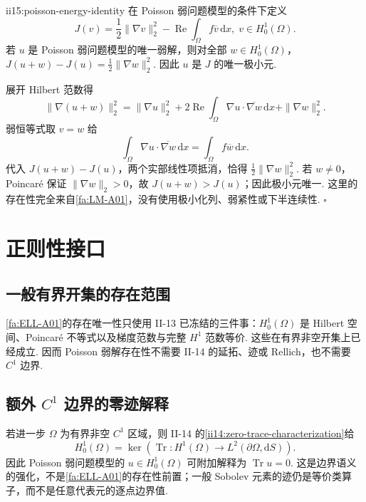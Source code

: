 \begin{FAProposition}{ii15:poisson-energy-identity}
在 Poisson 弱问题模型的条件下定义
\[
J(v)
=
\frac12\|\nabla v\|_2^2
-
\operatorname{Re}
\int_\Omega
f\overline v
\,\mathrm{d}x,
\;
v\in H_0^1(\Omega).
\]
若 \(\displaystyle u\) 是 Poisson 弱问题模型的唯一弱解，则对全部 \(\displaystyle w\in H_0^1(\Omega)\)， \(\displaystyle J(u+w)-J(u) = \frac12\|\nabla w\|_2^2.\)
因此 \(\displaystyle u\) 是 \(\displaystyle J\) 的唯一极小元.
\end{FAProposition}

\begin{FAProof}
展开 Hilbert 范数得
\[
\|\nabla(u+w)\|_2^2
=
\|\nabla u\|_2^2
+2\operatorname{Re}\int_\Omega\nabla u\mathbin{\cdot}\overline{\nabla w}\,\mathrm{d}x
+\|\nabla w\|_2^2.
\]
弱恒等式取 \(\displaystyle v=w\) 给
\[
\int_\Omega
\nabla u\mathbin{\cdot}\overline{\nabla w}
\,\mathrm{d}x
=
\int_\Omega
f\overline w
\,\mathrm{d}x.
\]
代入 \(\displaystyle J(u+w)-J(u)\)，两个实部线性项抵消，恰得 \(\displaystyle\frac12\|\nabla w\|_2^2\). 若 \(\displaystyle w\neq0\)，Poincaré 保证 \(\displaystyle\|\nabla w\|_2>0\)，故 \(\displaystyle J(u+w)>J(u)\)；因此极小元唯一. 这里的存在性完全来自\autoref{fa:LM-A01}，没有使用极小化列、弱紧性或下半连续性.
\hfill\(\square\)
\end{FAProof}

\section{正则性接口}\label{sec:ii15-regularity-interface}

\subsection{一般有界开集的存在范围}
\autoref{fa:ELL-A01}的存在唯一性只使用 II-13 已冻结的三件事：\(\displaystyle H_0^1(\Omega)\) 是 Hilbert 空间、Poincaré 不等式以及梯度范数与完整 \(\displaystyle H^1\) 范数等价. 这些在有界非空开集上已经成立. 因而 Poisson 弱解存在性不需要 II-14 的延拓、迹或 Rellich，也不需要 \(\displaystyle C^1\) 边界.

\subsection{额外 \(\displaystyle C^1\) 边界的零迹解释}
若进一步 \(\displaystyle\Omega\) 为有界非空 \(\displaystyle C^1\) 区域，则 II-14 的\autoref{ii14:zero-trace-characterization}给
\[
H_0^1(\Omega)
=
\ker\left(\operatorname{Tr}:H^1(\Omega)\to L^2(\partial\Omega,\mathrm{d}S)\right).
\]
因此 Poisson 弱问题模型的 \(\displaystyle u\in H_0^1(\Omega)\) 可附加解释为 \(\displaystyle\operatorname{Tr}u=0\). 这是边界语义的强化，不是\autoref{fa:ELL-A01}的存在性前置；一般 Sobolev 元素的迹仍是等价类算子，而不是任意代表元的逐点边界值.

